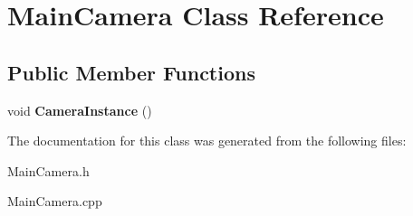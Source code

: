 \hypertarget{class_main_camera}{}\section{Main\+Camera Class Reference}
\label{class_main_camera}
\subsection*{Public Member Functions}
\begin{DoxyCompactItemize}
\item 
\hypertarget{class_main_camera_a037e576d9606a1b626468959a93bb3e4}{}void {\bfseries Camera\+Instance} ()\label{class_main_camera_a037e576d9606a1b626468959a93bb3e4}

\end{DoxyCompactItemize}


The documentation for this class was generated from the following files\+:\begin{DoxyCompactItemize}
\item 
Main\+Camera.\+h\item 
Main\+Camera.\+cpp\end{DoxyCompactItemize}
